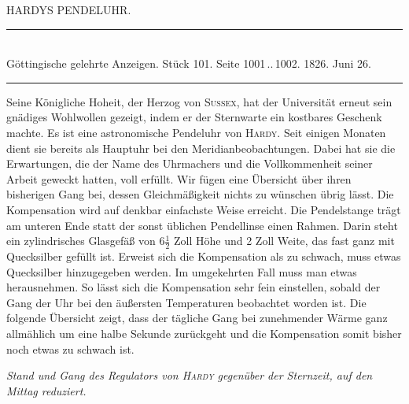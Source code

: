 \clearpage
{}
\hypertarget{native-458-hardy}{}
\begin{center}{\large HARDYS PENDELUHR.}\end{center}

\begin{center}
\rule{0.55\linewidth}{0.4pt}\\[2pt]
Göttingische gelehrte Anzeigen. Stück 101. Seite 1001\,..\,1002. 1826. Juni 26.\\[2pt]
\rule{0.55\linewidth}{0.4pt}
\end{center}

Seine Königliche Hoheit, der Herzog von \textsc{Sussex}, hat der Universität erneut sein gnädiges Wohlwollen gezeigt, indem er der Sternwarte ein kostbares Geschenk machte. Es ist eine astronomische Pendeluhr von \textsc{Hardy}. Seit einigen Monaten dient sie bereits als Hauptuhr bei den Meridianbeobachtungen. Dabei hat sie die Erwartungen, die der Name des Uhrmachers und die Vollkommenheit seiner Arbeit geweckt hatten, voll erfüllt. Wir fügen eine Übersicht über ihren bisherigen Gang bei, dessen Gleichmäßigkeit nichts zu wünschen übrig lässt. Die Kompensation wird auf denkbar einfachste Weise erreicht. Die Pendelstange trägt am unteren Ende statt der sonst üblichen Pendellinse einen Rahmen. Darin steht ein zylindrisches Glasgefäß von $6\frac{1}{2}$ Zoll Höhe und 2 Zoll Weite, das fast ganz mit Quecksilber gefüllt ist. Erweist sich die Kompensation als zu schwach, muss etwas Quecksilber hinzugegeben werden. Im umgekehrten Fall muss man etwas herausnehmen. So lässt sich die Kompensation sehr fein einstellen, sobald der Gang der Uhr bei den äußersten Temperaturen beobachtet worden ist. Die folgende Übersicht zeigt, dass der tägliche Gang bei zunehmender Wärme ganz allmählich um eine halbe Sekunde zurückgeht und die Kompensation somit bisher noch etwas zu schwach ist.

\begin{center}
\emph{Stand und Gang des Regulators von \textup{\textsc{Hardy}} gegenüber der Sternzeit, auf den Mittag reduziert.}
\end{center}


